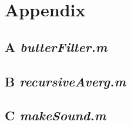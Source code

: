 \section{Appendix}

\subsection{A \emph{butterFilter.m}}


\subsection{B \emph{recursiveAverg.m}}


\subsection{C \emph{makeSound.m}}

%
